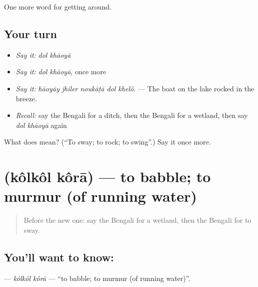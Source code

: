 \begin{grammarlens}[title={What you've built}]
One more word for getting around.
\end{grammarlens}

\subsection*{Your turn}
\begin{itemize}
\raggedright
  \item \emph{Say it:} \emph{dol khāoyā}
  \item \emph{Say it:} \emph{dol khāoyā}, once more
  \item \emph{Say it:} \emph{hāoyāy jhiler noukāṭā dol khelô.} — The boat on the lake rocked in the breeze.
  \item \emph{Recall:} say the Bengali for a ditch, then the Bengali for a wetland, then say \emph{dol khāoyā} again
\end{itemize}

\begin{tcolorbox}[breakable,colback=teal!4,colframe=teal!35!black,title={Before you move on}]
What does   mean? (\textquotedblleft{}To sway; to rock; to swing\textquotedblright{}.) Say it once more.
\end{tcolorbox}
\section[\texorpdfstring{\bn{কলকল} \bn{করা} (kôlkôl kôrā)}{কলকল করা (kôlkôl kôrā)}]{  (kôlkôl kôrā) — to babble; to murmur (of running water)}

\label{lesson:BN-C433-kolkol-kora}



\begin{quote}
Before the new one: say the Bengali for a wetland, then the Bengali for to sway.
\end{quote}

\subsection*{You'll want to know:  }
\textbf{ } — \emph{kôlkôl kôrā} — \textquotedblleft{}to babble; to murmur (of running water)\textquotedblright{}.

\begin{quote}
   
\end{quote}

